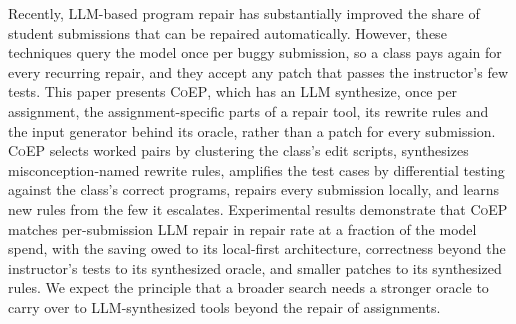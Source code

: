 \documentclass[acmsmall,screen,review,anonymous,nonacm]{acmart}
\newcommand{\tool}{\textsc{CoEP}\xspace}
\begin{document}
Recently, LLM-based program repair has substantially improved the share of student submissions that can be repaired automatically. However, these techniques query the model once per buggy submission, so a class pays again for every recurring repair, and they accept any patch that passes the instructor's few tests. This paper presents \tool, which has an LLM synthesize, once per assignment, the assignment-specific parts of a repair tool, its rewrite rules and the input generator behind its oracle, rather than a patch for every submission. \tool selects worked pairs by clustering the class's edit scripts, synthesizes misconception-named rewrite rules, amplifies the test cases by differential testing against the class's correct programs, repairs every submission locally, and learns new rules from the few it escalates. Experimental results demonstrate that \tool matches per-submission LLM repair in repair rate at a fraction of the model spend, with the saving owed to its local-first architecture, correctness beyond the instructor's tests to its synthesized oracle, and smaller patches to its synthesized rules. We expect the principle that a broader search needs a stronger oracle to carry over to LLM-synthesized tools beyond the repair of assignments.

\end{document}
